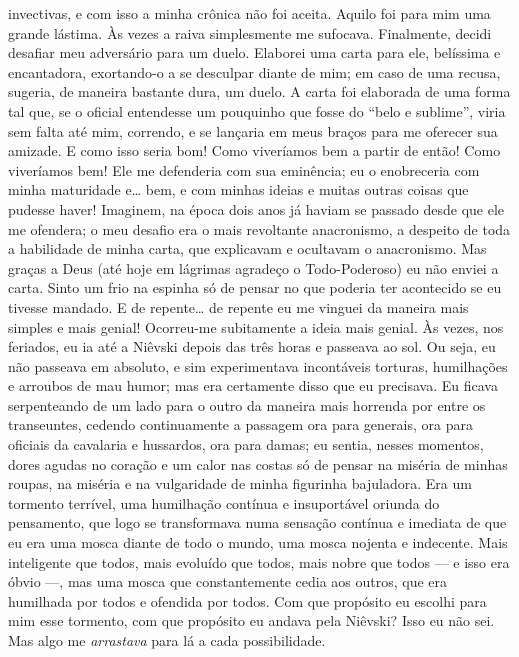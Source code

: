 invectivas, e com isso a minha crônica não foi aceita.  Aquilo foi para mim uma
grande lástima. Às vezes a raiva simplesmente me sufocava. Finalmente, decidi
desafiar meu adversário para um duelo.  Elaborei uma carta para ele, belíssima
e encantadora, exortando-o a se desculpar diante de mim; em caso de uma recusa,
sugeria, de maneira bastante dura, um duelo. A carta foi elaborada de uma forma
tal que, se o oficial entendesse um pouquinho que fosse do “belo e sublime”,
viria sem falta até mim, correndo, e se lançaria em meus braços para me
oferecer sua amizade. E como isso seria bom! Como viveríamos bem a partir de
então! Como viveríamos bem! Ele me defenderia com sua eminência; eu o
enobreceria com minha maturidade e\ldots{} bem, e com minhas ideias e muitas
outras coisas que pudesse haver! Imaginem, na época dois anos já haviam se
passado desde que ele me ofendera; o meu desafio era o mais revoltante
anacronismo, a despeito de toda a habilidade de minha carta, que explicavam e
ocultavam o anacronismo. Mas graças a Deus (até hoje em lágrimas agradeço o
Todo-Poderoso) eu não enviei a carta. Sinto um frio na espinha só de pensar no
que poderia ter acontecido se eu tivesse mandado. E de repente\ldots{} de
repente eu me vinguei da maneira mais simples e mais genial! Ocorreu-me
subitamente a ideia mais genial. Às vezes, nos feriados, eu ia até a Niêvski
depois das três horas e passeava ao sol. Ou seja, eu não passeava em absoluto,
e sim experimentava incontáveis torturas, humilhações e arroubos de mau humor;
mas era certamente disso que eu precisava. Eu ficava serpenteando de um lado
para o outro da maneira mais horrenda por entre os transeuntes, cedendo
continuamente a passagem ora para generais, ora para oficiais da cavalaria e
hussardos, ora para damas; eu sentia, nesses momentos, dores agudas no coração
e um calor nas costas só de pensar na miséria de minhas roupas, na miséria e na
vulgaridade de minha figurinha bajuladora. Era um tormento terrível, uma
humilhação contínua e insuportável oriunda do pensamento, que logo se
transformava numa sensação contínua e imediata de que eu era uma mosca diante
de todo o mundo, uma mosca nojenta e indecente. Mais inteligente que todos,
mais evoluído que todos, mais nobre que todos --- e isso era óbvio ---, mas uma
mosca que constantemente cedia aos outros, que era humilhada por todos e
ofendida por todos. Com que propósito eu escolhi para mim esse tormento, com
que propósito eu andava pela Niêvski? Isso eu não sei. Mas algo me
\textit{arrastava} para lá a cada possibilidade.


